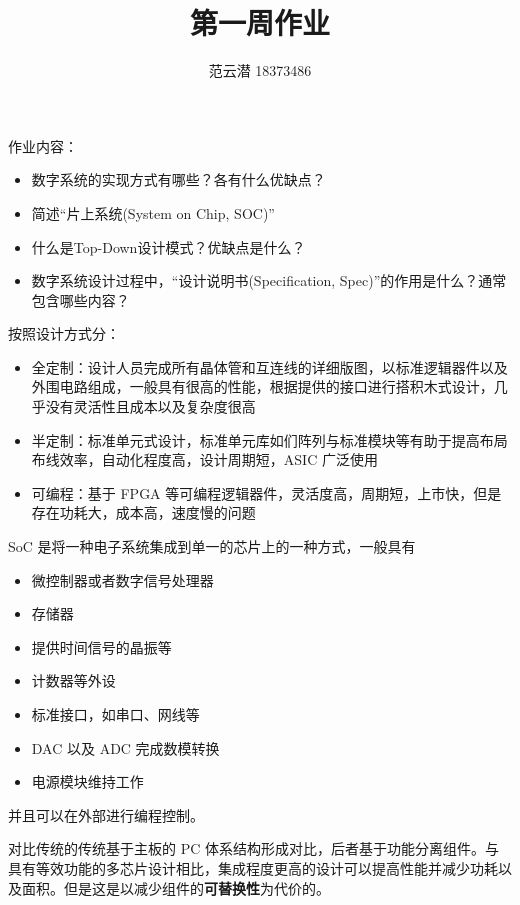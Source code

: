 \documentclass[lang=cn,11pt,a4paper,cite=authoryear]{elegantpaper}
\title{第一周作业}
\author{范云潜 18373486}
\institute{微电子学院 184111 班}
\date{\zhtoday}
\begin{document}
\maketitle

作业内容：

\begin{itemize}
    \item 数字系统的实现方式有哪些？各有什么优缺点？
    \item 简述“片上系统(System on Chip, SOC)”
    \item 什么是Top-Down设计模式？优缺点是什么？
    \item 数字系统设计过程中，“设计说明书(Specification, Spec)”的作用是什么？通常包含哪些内容？
\end{itemize}



按照设计方式分：

\begin{itemize}
    \item 全定制：设计人员完成所有晶体管和互连线的详细版图，以标准逻辑器件以及外围电路组成，一般具有很高的性能，根据提供的接口进行搭积木式设计，几乎没有灵活性且成本以及复杂度很高
    \item 半定制：标准单元式设计，标准单元库如们阵列与标准模块等有助于提高布局布线效率，自动化程度高，设计周期短，ASIC 广泛使用
    \item 可编程：基于 FPGA 等可编程逻辑器件，灵活度高，周期短，上市快，但是存在功耗大，成本高，速度慢的问题
\end{itemize}


SoC 是将一种电子系统集成到单一的芯片上的一种方式，一般具有 

\begin{itemize}
    \item 微控制器或者数字信号处理器
    \item 存储器
    \item 提供时间信号的晶振等
    \item 计数器等外设
    \item 标准接口，如串口、网线等
    \item DAC 以及 ADC 完成数模转换
    \item 电源模块维持工作
\end{itemize}
并且可以在外部进行编程控制。

对比传统的传统基于主板的 PC 体系结构形成对比，后者基于功能分离组件。与具有等效功能的多芯片设计相比，集成程度更高的设计可以提高性能并减少功耗以及面积。但是这是以减少组件的\textbf{可替换性}为代价的。
\end{document}
